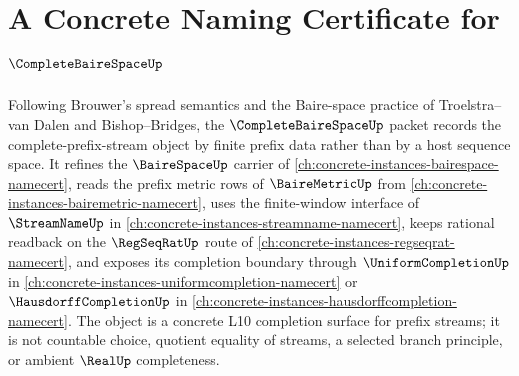 \chapter{A Concrete Naming Certificate for $\CompleteBaireSpaceUp$}
\label{ch:concrete-instances-complete-baire-space-namecert}

Following Brouwer's spread semantics and the Baire-space practice of Troelstra--van Dalen and Bishop--Bridges, the $\CompleteBaireSpaceUp$ packet records the complete-prefix-stream object by finite prefix data rather than by a host sequence space. It refines the $\BaireSpaceUp$ carrier of \autoref{ch:concrete-instances-bairespace-namecert}, reads the prefix metric rows of $\BaireMetricUp$ from \autoref{ch:concrete-instances-bairemetric-namecert}, uses the finite-window interface of $\StreamNameUp$ in \autoref{ch:concrete-instances-streamname-namecert}, keeps rational readback on the $\RegSeqRatUp$ route of \autoref{ch:concrete-instances-regseqrat-namecert}, and exposes its completion boundary through $\UniformCompletionUp$ in \autoref{ch:concrete-instances-uniformcompletion-namecert} or $\HausdorffCompletionUp$ in \autoref{ch:concrete-instances-hausdorffcompletion-namecert}. The object is a concrete L10 completion surface for prefix streams; it is not countable choice, quotient equality of streams, a selected branch principle, or ambient $\RealUp$ completeness.

